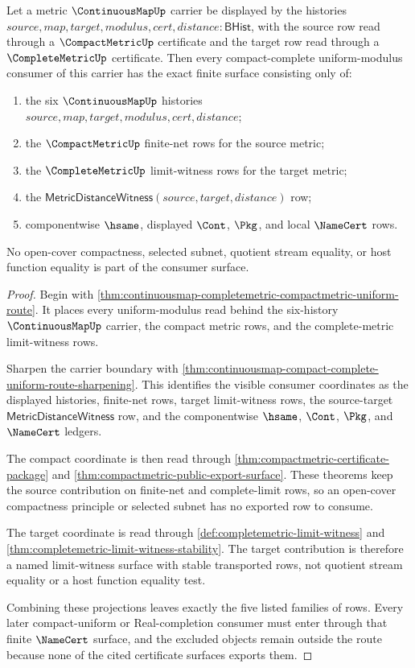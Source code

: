 \begin{theorem}
\label{thm:continuousmap-compact-complete-uniform-route-refinement}
Let a metric $\ContinuousMapUp$ carrier be displayed by the histories
$source,map,target,modulus,cert,distance:\mathsf{BHist}$, with the source row
read through a $\CompactMetricUp$ certificate and the target row read through
a $\CompleteMetricUp$ certificate. Then every compact-complete
uniform-modulus consumer of this carrier has the exact finite surface
consisting only of:
\begin{enumerate}
  \item the six $\ContinuousMapUp$ histories
  $source,map,target,modulus,cert,distance$;
  \item the $\CompactMetricUp$ finite-net rows for the source metric;
  \item the $\CompleteMetricUp$ limit-witness rows for the target metric;
  \item the $\mathsf{MetricDistanceWitness}(source,target,distance)$ row;
  \item componentwise $\hsame$, displayed $\Cont$, $\Pkg$, and local
  $\NameCert$ rows.
\end{enumerate}
No open-cover compactness, selected subnet, quotient stream equality, or host
function equality is part of the consumer surface.
\end{theorem}
\begin{proof}
Begin with
\autoref{thm:continuousmap-completemetric-compactmetric-uniform-route}. It
places every uniform-modulus read behind the six-history $\ContinuousMapUp$
carrier, the compact metric rows, and the complete-metric limit-witness rows.

Sharpen the carrier boundary with
\autoref{thm:continuousmap-compact-complete-uniform-route-sharpening}. This
identifies the visible consumer coordinates as the displayed histories,
finite-net rows, target limit-witness rows, the source-target
$\mathsf{MetricDistanceWitness}$ row, and the componentwise $\hsame$,
$\Cont$, $\Pkg$, and $\NameCert$ ledgers.

The compact coordinate is then read through
\autoref{thm:compactmetric-certificate-package} and
\autoref{thm:compactmetric-public-export-surface}. These theorems keep the
source contribution on finite-net and complete-limit rows, so an open-cover
compactness principle or selected subnet has no exported row to consume.

The target coordinate is read through
\autoref{def:completemetric-limit-witness} and
\autoref{thm:completemetric-limit-witness-stability}. The target contribution
is therefore a named limit-witness surface with stable transported rows, not
quotient stream equality or a host function equality test.

Combining these projections leaves exactly the five listed families of rows.
Every later compact-uniform or Real-completion consumer must enter through
that finite $\NameCert$ surface, and the excluded objects remain outside the
route because none of the cited certificate surfaces exports them.
\end{proof}


